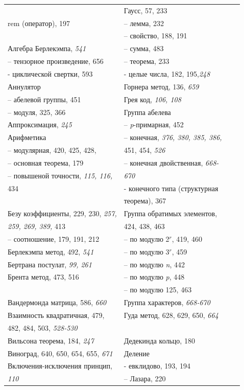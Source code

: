 \documentclass{mai_book}
\begin{document}
{\begin{tabular}{llcc}
	& Гаусс, 57, 233 \\ 
	rem (оператор), 197 & -- лемма, 232\\ 
	& -- свойство, 188, 191\\
Алгебра Берлекэмпа, {\itshape 541} & -- сумма, 483\\ 
	-- тензорное произведение, 656 & -- теорема, 233 \\ 
	- циклической свертки, 593 & - целые числа, 182, 195,{\itshape  248} \\ 
	Аннулятор & Горнера метод, 136, {\itshape 659} \\ 
	-- абелевой группы, 451 & Грея код, {\itshape 106, 108} \\ 
	-- модуля, 325, 366 & Группа абелева \\ 
Аппроксимация, \emph{245} & -- \emph{p}-примарная, 452 \\ 
	Арифметика & -- конечная, {\itshape 376, 380, 385, 386, } \\ 
	-- модулярная, 420, 425, 428, & 451, 454, \emph{526} \\ 
	-- основная теорема, 179 & -- конечная двойственная, \emph{668-} \\ 
		-- повышеной точности, \emph{115, 116,} & \emph{670} \\ 
 434 & - конечного типа (структурная \\ 
	 & теорема), 367 \\ 
Безу коэффициенты, 229, 230, \emph{257,}	& Группа обратимых элементов, \\
	{\itshape 259, 269, 389,} 413 & 424, 438, 463 \\ 
		-- соотношение, 179, 191, 212 & -- по модулю 2$^{r}$, 419, 460\\ 
 Берлекэмпа метод, 492, \emph{541}	& -- по модулю 3$^{r}$, 459 \\ 
	Бертрана постулат, {\itshape 99, 261} & -- по модулю \emph{n}, 442 \\
	Брента метод, 473, 516 &-- по модулю \emph{p}, 448 \\
	 & -- по модулю 125, 463\\ 
Вандермонда матрица, 586, \emph{660}	& Группа характеров, \emph{668-670} \\ 
Взаимность квадратичная, 479,	& Гуда метод, 628, 629, 650, \emph{664} \\ 

482, 484, 503, \emph{528-530}	& \\ 
Вильсона теорема, 184, \emph{247} & Дедекинда кольцо, 180 \\ 
	Виноград, 640, 650, 654, 655, \emph{671} & Деление\\ 
	Включения-исключения принцип, & - евклидово, 193, 194 \\
	\emph{110} & -- Лазара, 220 \\
\end{tabular}

}
\end{document}
